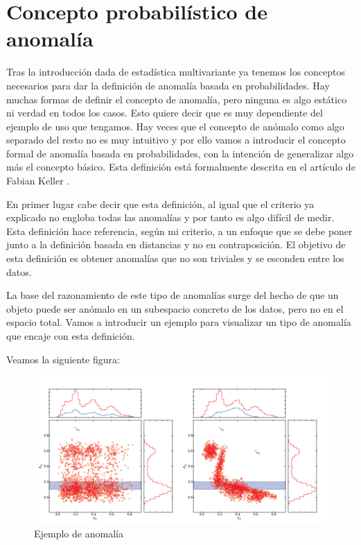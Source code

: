 \chapter{Concepto probabilístico de anomalía}
\label{chapter:anomalia_probabilidad}

Tras la introducción dada de estadística multivariante ya tenemos los conceptos necesarios para dar la definición de anomalía basada en probabilidades. Hay muchas formas de definir el concepto de anomalía, pero ninguna es algo estático ni verdad en todos los casos. Esto quiere decir que es muy dependiente del ejemplo de uso que tengamos. Hay veces que el concepto de anómalo como algo separado del resto no es muy intuitivo y por ello vamos a introducir el concepto formal de anomalía basada en probabilidades, con la intención de generalizar algo más el concepto básico. Esta definición está formalmente descrita en el artículo de Fabian Keller \cite{fabian_keller_hics_2012}.

En primer lugar cabe decir que esta definición, al igual que el criterio ya explicado no engloba todas las anomalías y por tanto es algo difícil de medir. Esta definición hace referencia, según mi criterio, a un enfoque que se debe poner junto a la definición basada en distancias y no en contraposición. El objetivo de esta definición es obtener anomalías que no son triviales y se esconden entre los datos.

La base del razonamiento de este tipo de anomalías surge del hecho de que un objeto puede ser anómalo en un subespacio concreto de los datos, pero no en el espacio total. Vamos a introducir un ejemplo para visualizar un tipo de anomalía que encaje con esta definición.

Veamos la siguiente figura:

\begin{figure}[H]
	\centering
	\label{ejemplo_anomalia_probabilidad}
	\includegraphics[scale=0.6]{imagenes/ejemplo_anomalia_probabilidad}
	\caption{Ejemplo de anomalía \cite{fabian_keller_hics_2012}}
\end{figure}

